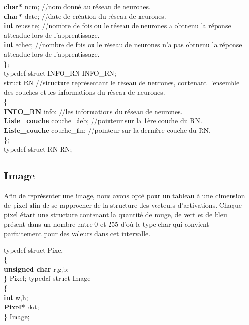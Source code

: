 \documentclass{article}
\newcommand\tab[1][1cm]{\hspace*{#1}}
\begin{document}
\begin{flushleft}
			\tab \textcolor{myblue}{\textbf{char*}} nom;	//nom donné au réseau de neurones.\\
			\tab \textcolor{myblue}{\textbf{char*}} date;	//date de création du réseau de neurones.\\
			\tab \textcolor{myblue}{\textbf{int}} reussite;	//nombre de fois ou le réseau de neurones a obtnenu la réponse attendue lors de l'apprentissage.\\
			\tab \textcolor{myblue}{\textbf{int}} echec;	//nombre de fois ou le réseau de neurones n'a pas obtnenu la réponse attendue lors de l'apprentissage.\\
		\};\\
		\bigbreak
		typedef struct INFO\_RN INFO\_RN;\\
		\bigbreak
		struct RN	//structure représentant le réseau de neurones, contenant l'ensemble des couches et les informations du réseau de neurones.\\
		\{\\
			\tab \textcolor{myblue}{\textbf{INFO\_RN}} info;	//les informations du réseau de neurones.\\
			\tab \textcolor{myblue}{\textbf{Liste\_couche}} couche\_deb;	//pointeur sur la 1ère couche du RN.\\
			\tab \textcolor{myblue}{\textbf{Liste\_couche}} couche\_fin;    //pointeur sur la dernière couche du RN.\\
		\};\\
		\bigbreak
		typedef struct RN RN;
		
	\end{flushleft}
	
	\subsection{Image}
	Afin de représenter une image, nous avons opté pour un tableau à une dimension de pixel afin de se rapprocher de la structure des vecteurs d'activations.
	Chaque pixel étant une structure contenant la quantité de rouge, de vert et de bleu présent dans un nombre entre 0 et 255 d'où le type char qui convient parfaitement pour des valeurs dans cet intervalle.
	\begin{flushleft}
		typedef struct Pixel\\
			\{\\
				\tab \textcolor{myblue}{\textbf{unsigned char}} r,g,b;\\
			\} Pixel;
		\bigbreak
		typedef struct Image\\
			\{\\
				\tab \textcolor{myblue}{\textbf{int}} w,h;\\
				\tab \textcolor{myblue}{\textbf{Pixel*}} dat;\\
			\} Image;
	\end{flushleft}
	
\end{document}
